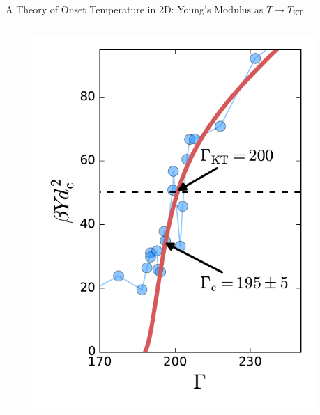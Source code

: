 \begin{frame}{A Theory of Onset Temperature in 2D: Young's Modulus as $T \to T_\mathrm{KT}$}
\begin{columns}
\begin{column}[T]{0.425\textwidth}
\begin{figure}
\begin{overprint}
\centering\includegraphics[height=0.75\textheight]{c.13-kt_keim_1/YRG_keim_closeup.pdf}%
    
    
    \end{overprint}
    \end{figure}
    

\end{column}

\begin{column}[T]{0.575\textwidth}



\end{column}
\end{columns}
\end{frame}
